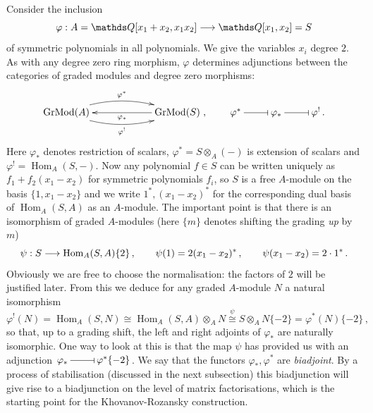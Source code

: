 \documentclass{compositio}
\theoremstyle{definition}
\numberwithin{equation}{section}
\def\Hom{\operatorname{Hom}}
\def\Grmodd{\operatorname{GrMod}}
\begin{document}
Consider the inclusion
\[
\varphi: A = \QQ[x_1 + x_2, x_1 x_2] \lto \QQ[x_1,x_2] = S
\]
of symmetric polynomials in all polynomials. We give the variables $x_i$ degree $2$. As with any degree zero ring morphism, $\varphi$ determines adjunctions between the categories of graded modules and degree zero morphisms: 
\[
\xymatrix@C+3pc{
\Grmodd(A) \ar@/^1pc/[r]^-{\varphi^*} \ar@/_1pc/[r]_-{\varphi^!} & \Grmodd(S) \ar[l]^-{\varphi_*}
}, \qquad
\xymatrix{
\varphi^* \ar@{-|}[r] & \varphi_* \ar@{-|}[r] & \varphi^!\,.
}
\]
Here $\varphi_*$ denotes restriction of scalars, $\varphi^* = S \otimes_A (-)$ is extension of scalars and $\varphi^! = \Hom_A(S, -)$. Now any polynomial $f \in S$ can be written uniquely as $f_1 + f_2(x_1-x_2)$ for symmetric polynomials $f_i$, so $S$ is a free $A$-module on the basis $\{1, x_1 - x_2\}$ and we write $1^*, (x_1-x_2)^*$ for the corresponding dual basis of $\Hom_A(S,A)$ as an $A$-module. The important point is that there is an isomorphism of graded $A$-modules (here $\{ m \}$ denotes shifting the grading \emph{up} by $m$)
\[
\psi: S \lto \Hom_A(S,A)\{2\} \, , \qquad \psi(1) = 2(x_1-x_2)^* \, , \qquad \psi(x_1-x_2) = 2 \cdot 1^* \, .
\]
Obviously we are free to choose the normalisation: the factors of $2$ will be justified later. From this we deduce for any graded $A$-module $N$ a natural isomorphism 
\[
\varphi^!(N) = \Hom_A(S,N) \cong \Hom_A(S,A) \otimes_A N \stackrel{\psi}{\cong} S \otimes_A N \{-2\} = \varphi^*(N)\{-2\} \, ,
\]
so that, up to a grading shift, the left and right adjoints of $\varphi_*$ are naturally isomorphic. One way to look at this is that the map $\psi$ has provided us with an adjunction $\xymatrix@1{\varphi_*\, \ar@{-|}[r] & \,\varphi^*\{-2\}}$. We say that the functors $\varphi_*, \varphi^*$ are \emph{biadjoint}. By a process of stabilisation (discussed in the next subsection) this biadjunction will give rise to a biadjunction on the level of matrix factorisations, which is the starting point for the Khovanov-Rozansky construction.
\end{document}
